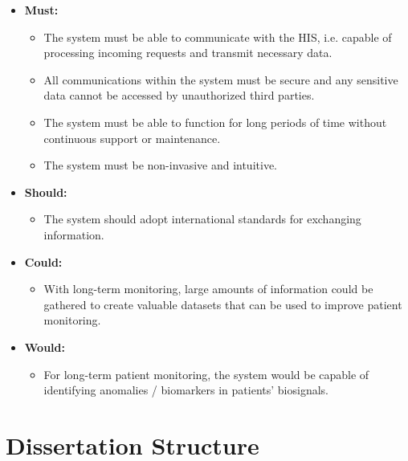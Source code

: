 


\begin{itemize}
    \item \textbf{Must:}
    \begin{itemize}
        \item The system must be able to communicate with the \acs{HIS}, i.e. capable of processing incoming requests and transmit necessary data.
        \item All communications within the system must be secure and any sensitive data cannot be accessed by unauthorized third parties.
        \item The system must be able to function for long periods of time without continuous support or maintenance.
        \item The system must be non-invasive and intuitive.
    \end{itemize}
    \item \textbf{Should:}
    \begin{itemize}   
        \item The system should adopt international standards for exchanging information.
    \end{itemize}
    \item \textbf{Could:}
    \begin{itemize}   
        \item With long-term monitoring, large amounts of information could be gathered to create valuable datasets that can be used to improve patient monitoring.
    \end{itemize}
    \item \textbf{Would:}
    \begin{itemize}
        \item For long-term patient monitoring, the system would be capable of identifying anomalies / biomarkers in patients' biosignals.
    \end{itemize}
\end{itemize}

\section{Dissertation Structure}

